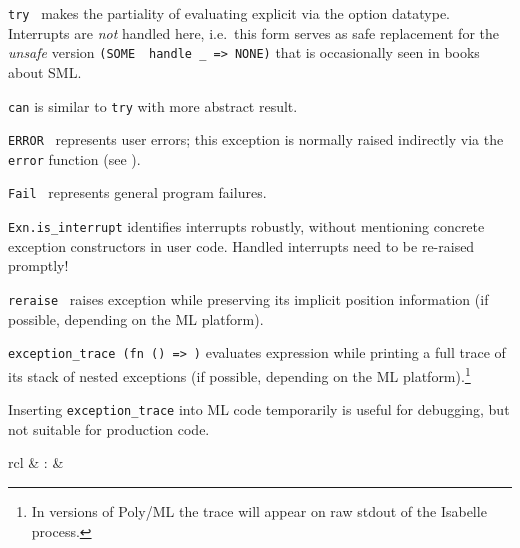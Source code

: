 \begin{isabellebody}
\begin{isamarkuptext}
\begin{description}
  \item \verb|try|~ makes the partiality of evaluating
   explicit via the option datatype.  Interrupts are
  \emph{not} handled here, i.e.\ this form serves as safe replacement
  for the \emph{unsafe} version \verb|(SOME|~~\verb|handle _ => NONE)| that is occasionally seen in
  books about SML.

  \item \verb|can| is similar to \verb|try| with more abstract result.

  \item \verb|ERROR|~ represents user errors; this
  exception is normally raised indirectly via the \verb|error| function
  (see ).

  \item \verb|Fail|~ represents general program failures.

  \item \verb|Exn.is_interrupt| identifies interrupts robustly, without
  mentioning concrete exception constructors in user code.  Handled
  interrupts need to be re-raised promptly!

  \item \verb|reraise|~ raises exception 
  while preserving its implicit position information (if possible,
  depending on the ML platform).

  \item \verb|exception_trace|~\verb|(fn () =>|~\verb|)| evaluates expression  while printing
  a full trace of its stack of nested exceptions (if possible,
  depending on the ML platform).\footnote{In versions of Poly/ML the
  trace will appear on raw stdout of the Isabelle process.}

  Inserting \verb|exception_trace| into ML code temporarily is useful
  for debugging, but not suitable for production code.

  \end{description}%
\end{isamarkuptext}%
\isamarkuptrue%
%
\endisatagmlref
{\isafoldmlref}%
%
\isadelimmlref
%
\endisadelimmlref
%
\isadelimmlantiq
%
\endisadelimmlantiq
%
\isatagmlantiq
%
\begin{isamarkuptext}%
\begin{matharray}{rcl}
  \hypertarget{ML antiquotation.assert}{\hyperlink{ML antiquotation.assert}{\mbox{}}} & : &  \\
  \end{matharray}


\end{isamarkuptext}
\end{isabellebody}

